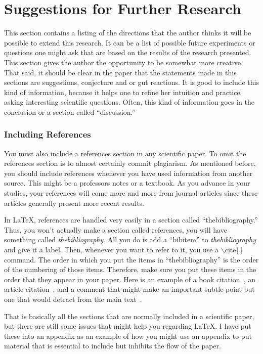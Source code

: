 \documentclass[preprint,pre,floats,aps,amsmath,amssymb]{revtex4}
\begin{document}
\section{Suggestions for Further Research}
\label{sec:further_research}

This section contains a listing of the directions that the author
thinks it will be possible to extend this research.  It can be a list
of possible future experiments or questions one might ask that are
based on the results of the research presented.  This section gives
the author the opportunity to be somewhat more creative.  That said,
it should be clear in the paper that the statements made in this
sections are suggestions, conjecture and or gut reactions.  It is good
to include this kind of information, because it helps one to refine
her intuition and practice asking interesting scientific questions. 
Often, this kind of information goes in the conclusion or a section
called ``discussion.''

\subsubsection*{Including References}

You must also include a references section in any scientific paper. 
To omit the references section is to almost certainly commit
plagiarism. As mentioned before, you should include references
whenever you have used information from another source.  This might be
a professors notes or a textbook.  As you advance in your studies,
your references will come more and more from journal articles since
these articles generally present more recent results.

In \LaTeX, references are handled very easily in a section called
``thebibliography.''  Thus, you won't actually make a section called
references, you will have something called \textit{thebibliography}. 
All you do is add a ``bibitem'' to \textit{thebibliography} and give
it a label.  Then, whenever you want to refer to it, you use a
$\backslash$cite\{\} command.  The order in which you put the items in
``thebibliography'' is the order of the numbering of those items. 
Therefore, make sure you put these items in the order that they appear
in your paper.  Here is an example of a book citation~\cite{FHD}, an
article citation~\cite{Jackson}, and a comment that might make an
important subtle point but one that would detract from the main
text~\cite{Comment}.

That is basically all the sections that are normally included in a
scientific paper, but there are still some issues that might help you
regarding \LaTeX.  I have put these into an appendix as an example of
how you might use an appendix to put material that is essential to
include but inhibits the flow of the paper.
\end{document}
